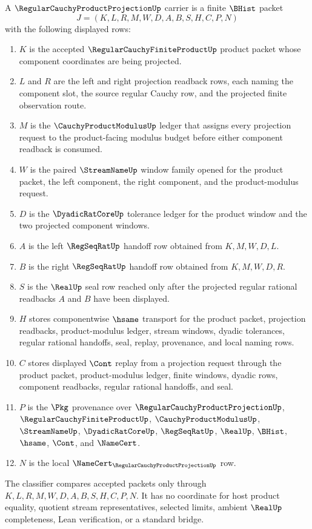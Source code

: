 \begin{definition}\label{def:regular-cauchy-product-projection-carrier}
A $\RegularCauchyProductProjectionUp$ carrier is a finite $\BHist$ packet
$$
J=(K,L,R,M,W,D,A,B,S,H,C,P,N)
$$
with the following displayed rows:
\begin{enumerate}
\item $K$ is the accepted $\RegularCauchyFiniteProductUp$ product packet whose component coordinates are being projected.
\item $L$ and $R$ are the left and right projection readback rows, each naming the component slot, the source regular Cauchy row, and the projected finite observation route.
\item $M$ is the $\CauchyProductModulusUp$ ledger that assigns every projection request to the product-facing modulus budget before either component readback is consumed.
\item $W$ is the paired $\StreamNameUp$ window family opened for the product packet, the left component, the right component, and the product-modulus request.
\item $D$ is the $\DyadicRatCoreUp$ tolerance ledger for the product window and the two projected component windows.
\item $A$ is the left $\RegSeqRatUp$ handoff row obtained from $K,M,W,D,L$.
\item $B$ is the right $\RegSeqRatUp$ handoff row obtained from $K,M,W,D,R$.
\item $S$ is the $\RealUp$ seal row reached only after the projected regular rational readbacks $A$ and $B$ have been displayed.
\item $H$ stores componentwise $\hsame$ transport for the product packet, projection readbacks, product-modulus ledger, stream windows, dyadic tolerances, regular rational handoffs, seal, replay, provenance, and local naming rows.
\item $C$ stores displayed $\Cont$ replay from a projection request through the product packet, product-modulus ledger, finite windows, dyadic rows, component readbacks, regular rational handoffs, and seal.
\item $P$ is the $\Pkg$ provenance over $\RegularCauchyProductProjectionUp$, $\RegularCauchyFiniteProductUp$, $\CauchyProductModulusUp$, $\StreamNameUp$, $\DyadicRatCoreUp$, $\RegSeqRatUp$, $\RealUp$, $\BHist$, $\hsame$, $\Cont$, and $\NameCert$.
\item $N$ is the local $\NameCert_{\RegularCauchyProductProjectionUp}$ row.
\end{enumerate}
The classifier compares accepted packets only through $K,L,R,M,W,D,A,B,S,H,C,P,N$. It has no coordinate for host product equality, quotient stream representatives, selected limits, ambient $\RealUp$ completeness, Lean verification, or a standard bridge.
\end{definition}

